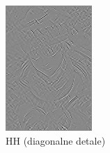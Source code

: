 \begin{figure}[ht]
\begin{minipage}[t]{0.35\linewidth}
        \includegraphics[width=\linewidth]{Rozdziały/02.Podstawy_teoretyczne/Obrazy/level_1_decomposition_HH.png}
        \caption{HH (diagonalne detale)}
        \label{fig:image45}
    \end{minipage}
\end{figure}

